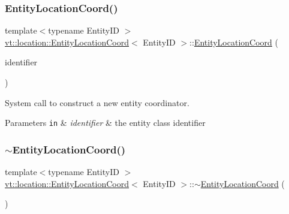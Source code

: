 \subsubsection{\texorpdfstring{Entity\+Location\+Coord()}{EntityLocationCoord()}\hspace{0.1cm}{\footnotesize\ttfamily [3/3]}}
{\footnotesize\ttfamily template$<$typename Entity\+ID $>$ \\
\hyperlink{structvt_1_1location_1_1_entity_location_coord}{vt\+::location\+::\+Entity\+Location\+Coord}$<$ Entity\+ID $>$\+::\hyperlink{structvt_1_1location_1_1_entity_location_coord}{Entity\+Location\+Coord} (\begin{DoxyParamCaption}\item[{\hyperlink{namespacevt_1_1location_a4db6456e8024af2d23fc5ae560fef866}{Loc\+Inst\+Type} const}]{identifier }\end{DoxyParamCaption})\hspace{0.3cm}{\ttfamily [explicit]}}



System call to construct a new entity coordinator. 


\begin{DoxyParams}[1]{Parameters}
\mbox{\tt in}  & {\em identifier} & the entity class identifier \\
\hline
\end{DoxyParams}
\mbox{\label{structvt_1_1location_1_1_entity_location_coord_af68fd9bb9fcbf02f693ba2af503ed409}} 
\subsubsection{\texorpdfstring{$\sim$\+Entity\+Location\+Coord()}{~EntityLocationCoord()}}
{\footnotesize\ttfamily template$<$typename Entity\+ID $>$ \\
\hyperlink{structvt_1_1location_1_1_entity_location_coord}{vt\+::location\+::\+Entity\+Location\+Coord}$<$ Entity\+ID $>$\+::$\sim$\hyperlink{structvt_1_1location_1_1_entity_location_coord}{Entity\+Location\+Coord} (\begin{DoxyParamCaption}{ }\end{DoxyParamCaption})\hspace{0.3cm}{\ttfamily [virtual]}}



